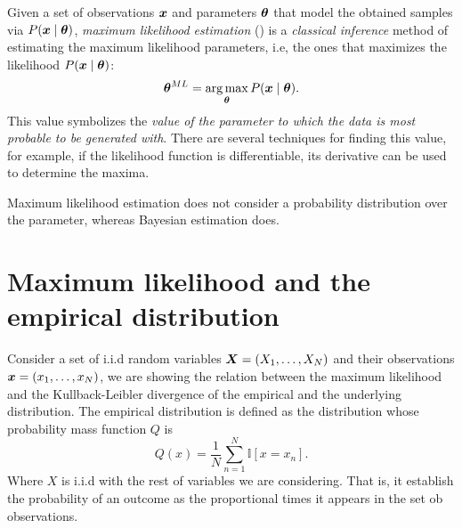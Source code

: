 
Given a set of observations \(\bm{x}\) and parameters \(\bm{\theta}\) that model the obtained samples via \(P(\bm{x} \mid \bm{\theta})\), \emph{maximum likelihood estimation} (\cite{rossi2018mathematical}) is a \emph{classical inference} method of estimating the maximum likelihood parameters, i.e, the ones that maximizes the likelihood \(P(\bm{x} \mid \bm{\theta})\):
  \[
    \bm{\theta}^{ML} = \operatorname*{arg\,max}_{\bm{\theta}} P(\bm{x} \mid \bm{\theta}).
  \]
  This value symbolizes the \emph{value of the parameter to which the data is most probable to be generated with}. There are several techniques for finding this value, for example, if the likelihood function is differentiable, its derivative can be used to determine the maxima.

  \begin{remark}
    Maximum likelihood estimation does not consider a probability distribution over the parameter, whereas Bayesian estimation does.
  \end{remark}

\section{Maximum likelihood and the empirical distribution}

Consider a set of i.i.d random variables \(\bm{X} = (X_{1},\dots, X_{N})\) and their observations \(\bm{x} = (x_{1},\dots,x_{N})\), we are showing the relation between the maximum likelihood and the Kullback-Leibler divergence of the empirical and the underlying distribution. The empirical distribution is defined as the distribution whose probability mass function \(Q\) is
\[
  Q(x) = \frac{1}{N}\sum_{n = 1}^N \mathbb{I}[x = x_n].
\]
Where \(X\) is i.i.d with the rest of variables we are considering. That is, it establish the probability of an outcome as the proportional times it appears in the set ob observations.

